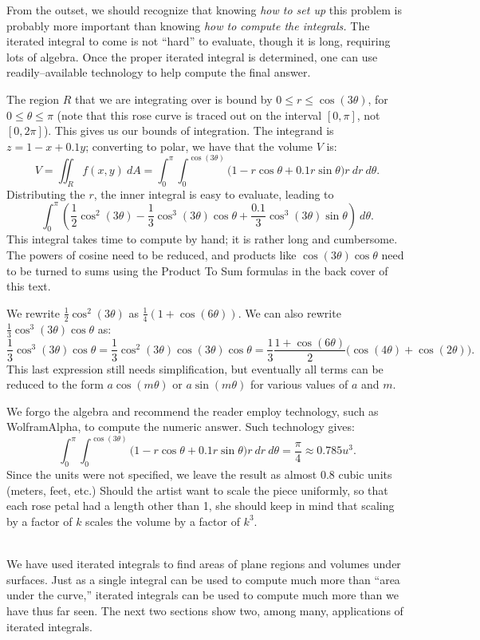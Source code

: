 {From the outset, we should recognize that knowing \textit{how to set up} this problem is probably more important than knowing \textit{how to compute the integrals.} The iterated integral to come is not ``hard'' to evaluate, though it is long, requiring lots of algebra. Once the proper iterated integral is determined, one can use readily--available technology to help  compute the final answer. 

The region $R$ that we are integrating over is bound by $0\leq r\leq \cos(3\theta)$, for $0\leq \theta\leq\pi$ (note that this rose curve is traced out on the interval $[0,\pi]$, not $[0,2\pi]$). This gives us our bounds of integration. The integrand is $z=1-x+0.1y$; converting to polar, we have that the volume $V$ is:
$$V = \iint_R f(x,y)\ dA = \int_0^\pi\int_0^{\cos(3\theta)}\big(1-r\cos\theta+0.1r\sin\theta\big)r\ dr\ d\theta.$$
Distributing the $r$, the inner integral is easy to evaluate, leading to 
$$ \int_0^\pi \left(\frac12\cos^2(3\theta)-\frac13\cos^3(3\theta)\cos\theta+\frac{0.1}3\cos^3(3\theta)\sin\theta\right)\ d\theta.$$
This integral takes time to compute by hand; it is rather long and cumbersome. The powers of cosine need to be reduced, and products like $\cos(3\theta)\cos\theta$ need to be turned to sums using the Product To Sum formulas in the back cover of this text. 

We rewrite $\frac12\cos^2(3\theta)$ as $\frac14(1+\cos(6\theta))$. We can also rewrite $\frac13\cos^3(3\theta)\cos\theta$ as: 
$$\frac13\cos^3(3\theta)\cos\theta = \frac13\cos^2(3\theta)\cos(3\theta)\cos\theta = \frac13\frac{1+\cos(6\theta)}2\big(\cos(4\theta)+\cos(2\theta)\big).$$
This last expression still needs simplification, but eventually all terms can be reduced to the form $a\cos(m\theta)$ or $a\sin(m\theta)$ for various values of $a$ and $m$.

We forgo the algebra and recommend the reader employ technology, such as WolframAlpha\textregistered, to compute the numeric answer. Such technology gives:
$$\int_0^\pi\int_0^{\cos(3\theta)}\big(1-r\cos\theta+0.1r\sin\theta\big)r\ dr\ d\theta = \frac{\pi}{4} \approx 0.785u^3.$$
Since the units were not specified, we leave the result as almost $0.8$ cubic units (meters, feet, etc.) Should the artist want to scale the piece uniformly, so that each rose petal had a length other than 1, she should keep in mind that scaling by a factor of $k$ scales the volume by a factor of $k^3$. 
}\\

We have used iterated integrals to find areas of plane regions and volumes under surfaces. Just as a single integral can be used to compute much more than ``area under the curve,'' iterated integrals can be used to compute much more than we have thus far seen. The next two sections show two, among many, applications of iterated integrals.

